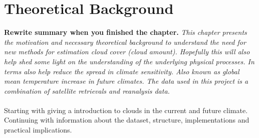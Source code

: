 \setcounter{chapter}{1} 
\chapter{Theoretical Background} \label{ch:theoretical_back}
\textbf{Rewrite summary when you finished the chapter.}
\textit{This chapter presents the motivation and necessary theoretical background  to understand the need for new methods for estimation cloud cover \textit{(cloud amount)}. Hopefully this will also help shed some light on the understanding of the underlying physical processes. In terms also help reduce the spread in climate sensitivity. Also known as global mean temperature increase in future climates. The data used in this project is a combination of satellite retrievals and reanalysis data.}
\\ \\
Starting with giving a introduction to clouds in the current and future climate. Continuing with information about the dataset, structure, implementations and practical implications.


